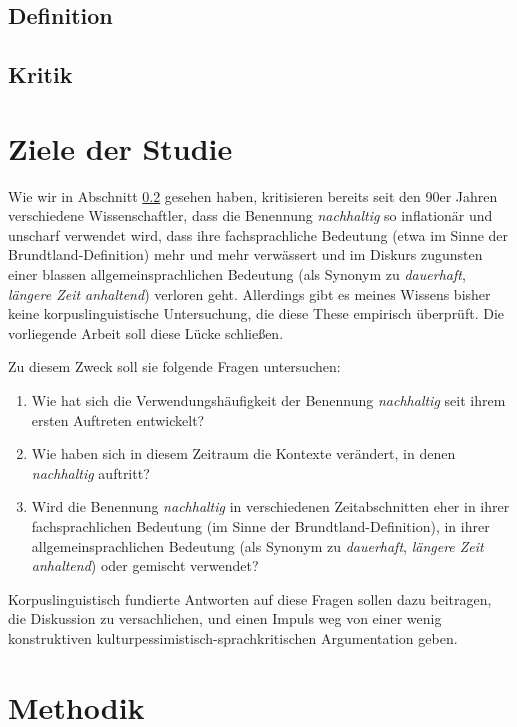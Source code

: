 \documentclass[
    german,
    a4paper,%
    12pt,%
    oneside,%
    toc=bibliography,
    final,
]{scrartcl}
\begin{document}
\subsection{Definition}
\label{subsec:definition}

\subsection{Kritik}
\label{subsec:kritik}

\section{Ziele der Studie}
\label{sec:ziele}

Wie wir in Abschnitt \ref{subsec:kritik} gesehen haben, kritisieren bereits seit den 90er Jahren verschiedene Wissenschaftler, dass die Benennung \textit{nachhaltig} so inflationär und unscharf verwendet wird, dass ihre fachsprachliche Bedeutung (etwa im Sinne der Brundtland-Definition) mehr und mehr verwässert und im Diskurs zugunsten einer blassen allgemeinsprachlichen Bedeutung (als Synonym zu \textit{dauerhaft}, \textit{längere Zeit anhaltend}) verloren geht. Allerdings gibt es meines Wissens bisher keine korpuslinguistische Untersuchung, die diese These empirisch überprüft. Die vorliegende Arbeit soll diese Lücke schließen.

Zu diesem Zweck soll sie folgende Fragen untersuchen:

\begin{enumerate}
\item Wie hat sich die Verwendungshäufigkeit der Benennung \textit{nachhaltig} seit ihrem ersten Auftreten entwickelt?
\item Wie haben sich in diesem Zeitraum die Kontexte verändert, in denen \textit{nachhaltig} auftritt?
\item Wird die Benennung \textit{nachhaltig} in verschiedenen Zeitabschnitten eher in ihrer fachsprachlichen Bedeutung (im Sinne der Brundtland-Definition), in ihrer allgemeinsprachlichen Bedeutung (als Synonym zu \textit{dauerhaft}, \textit{längere Zeit anhaltend}) oder gemischt verwendet?
\end{enumerate}

Korpuslinguistisch fundierte Antworten auf diese Fragen sollen dazu beitragen, die Diskussion zu versachlichen, und einen Impuls weg von einer wenig konstruktiven kulturpessimistisch-sprachkritischen Argumentation geben.

\section{Methodik}
\label{sec:methodik}
\end{document}
